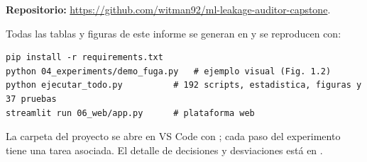 
\label{an:repro}

\textbf{Repositorio:} \url{https://github.com/witman92/ml-leakage-auditor-capstone}.

Todas las tablas y figuras de este informe se generan en  y se reproducen con:

\begin{footnotesize}
\begin{verbatim}
pip install -r requirements.txt
python 04_experiments/demo_fuga.py   # ejemplo visual (Fig. 1.2)
python ejecutar_todo.py          # 192 scripts, estadistica, figuras y 37 pruebas
streamlit run 06_web/app.py      # plataforma web
\end{verbatim}
\end{footnotesize}

La carpeta del proyecto se abre en VS Code con ; cada paso del experimento tiene una tarea asociada. El detalle de decisiones y desviaciones está en .
